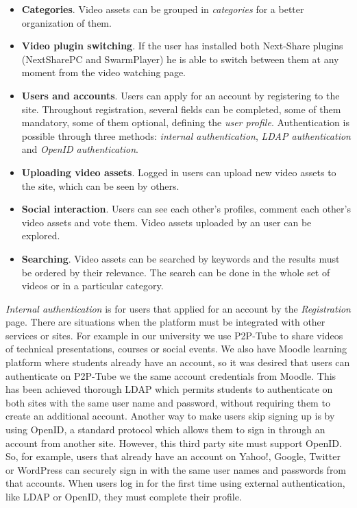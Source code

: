 \begin{itemize}
 \item \textbf{Categories}. Video assets can be grouped in \textit{categories} for a better organization of them.
 \item \textbf{Video plugin switching}. If the user has installed both Next-Share plugins (NextSharePC and SwarmPlayer) he is able to switch between them at any moment from the video watching page.
 \item \textbf{Users and accounts}. Users can apply for an account by registering to the site. Throughout registration, several fields can be completed, some of them mandatory, some of them optional, defining the \textit{user profile}. Authentication is possible through three methods: \textit{internal authentication}, \textit{LDAP authentication} and \textit{OpenID authentication}.
 \item \textbf{Uploading video assets}. Logged in users can upload new video assets to the site, which can be seen by others.
 \item \textbf{Social interaction}. Users can see each other's profiles, comment each other's video assets and vote them. Video assets uploaded by an user can be explored.
 \item \textbf{Searching}. Video assets can be searched by keywords and the results must be ordered by their relevance. The search can be done in the whole set of videos or in a particular category.
\end{itemize}

\textit{Internal authentication} is for users that applied for an account by the \textit{Registration} page. There are situations when the platform must be integrated with other services or sites. For example in our university we use P2P-Tube to share videos of technical presentations, courses or social events. We also have Moodle learning platform where students already have an account, so it was desired that users can authenticate on P2P-Tube we the same account credentials from Moodle. This has been achieved thorough LDAP which permits students to authenticate on both sites with the same user name and password, without requiring them to create an additional account. Another way to make users skip signing up is by using OpenID, a standard protocol which allows them to sign in through an account from another site. However, this third party site must support OpenID. So, for example, users that already have an account on Yahoo!, Google, Twitter or WordPress can securely sign in with the same user names and passwords from that accounts. When users log in for the first time using external authentication, like LDAP or OpenID, they must complete their profile.

